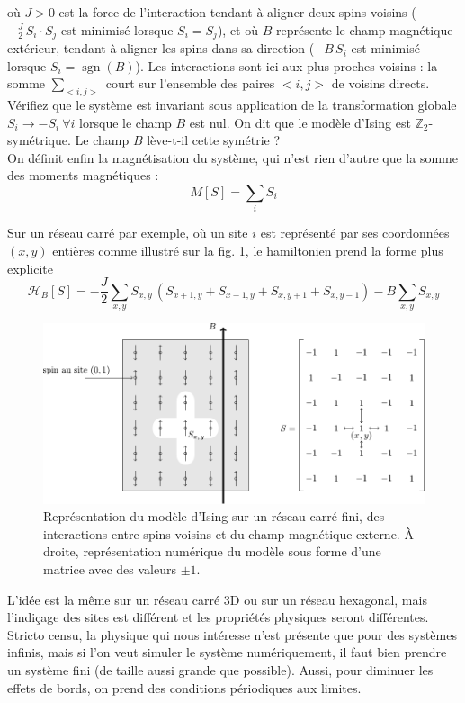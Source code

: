 \documentclass{book}
\begin{document}
où $J>0$ est la force de l'interaction tendant à aligner deux spins voisins ($-\frac{J}{2}\,S_i\cdot S_j$ est minimisé lorsque $S_i=S_j$), et où $B$ représente le champ magnétique extérieur, tendant à aligner les spins dans sa direction ($-B\,S_i$ est minimisé lorsque $S_i=\operatorname{sgn}(B)$). Les interactions sont ici aux plus proches voisins : la somme $\sum_{<i,j>}$ court sur l'ensemble des paires $<\!i,j\!>$ de voisins directs. Vérifiez que le système est invariant sous application de la transformation globale $S_i\to-S_i\ \forall i$ lorsque le champ $B$ est nul. On dit que le modèle d'Ising est $\mathbb{Z}_2$-symétrique. Le champ $B$ lève-t-il cette symétrie ?\\

On définit enfin la magnétisation du système, qui n'est rien d'autre que la somme des moments magnétiques :
\begin{equation}
 M[S] = \sum_i S_i
\end{equation}

Sur un réseau carré par exemple, où un site $i$ est représenté par ses coordonnées $(x,y)$ entières comme illustré sur la fig. \ref{fig:schema_ising}, le hamiltonien prend la forme plus explicite
\begin{equation}
\mathcal{H}_B[S] = -\frac{J}{2}\sum_{x,y}S_{x,y}\,(S_{x+1,y}+S_{x-1,y}+S_{x,y+1}+S_{x,y-1})-B\sum_{x,y}S_{x,y}
\end{equation}

\begin{figure}[H]
\centering
\includegraphics[width=0.85\linewidth]{TD3/schema_ising.pdf}
\caption{Représentation du modèle d'Ising sur un réseau carré fini, des interactions entre spins voisins et du champ magnétique externe. À droite, représentation numérique du modèle sous forme d'une matrice avec des valeurs $\pm 1$.}
\label{fig:schema_ising}
\end{figure}

L'idée est la même sur un réseau carré 3D ou sur un réseau hexagonal, mais l'indiçage des sites est différent et les propriétés physiques seront différentes. Stricto censu, la physique qui nous intéresse n'est présente que pour des systèmes infinis, mais si l'on veut simuler le système numériquement, il faut bien prendre un système fini (de taille aussi grande que possible). Aussi, pour diminuer les effets de bords, on prend des conditions périodiques aux limites.\\
\end{document}
